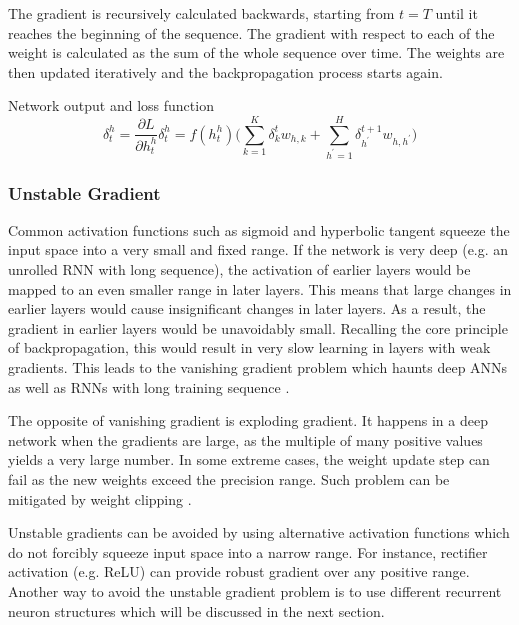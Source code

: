 \documentclass[11pt]{article} %
\theoremstyle{plain}
\theoremstyle{definition}
\begin{document}
The gradient is recursively calculated backwards, starting from \(t=T\) until it reaches the beginning of the sequence. The gradient with respect to each of the weight is calculated as the sum of the whole sequence over time. The weights are then updated iteratively and the backpropagation process starts again.

Network output and loss function
\begin{subequations} 
	\begin{equation}
	\label{differentiation}	
	\delta^h_t=\frac{\partial{L}}{\partial h^h_t}	
	\end{equation}
	\begin{equation}
	\label{weight_update}
	\delta^h_t=f(h^h_t)\Bigg(\sum_{k=1}^{K}\delta_k^tw_{h,k}+\sum_{h^\prime=1}^{H}\delta_{h^\prime}^{t+1}w_{h,h^\prime}\Bigg)
	\end{equation}
\end{subequations}


\subsubsection{Unstable Gradient}

Common activation functions such as sigmoid and hyperbolic tangent squeeze the input space into a very small and fixed range. If the network is very deep (e.g. an unrolled RNN with long sequence), the activation of earlier layers would be mapped to an even smaller range in later layers. This means that large changes in earlier layers would cause insignificant changes in later layers. As a result, the gradient in earlier layers would be unavoidably small. Recalling the core principle of backpropagation, this would result in very slow learning in layers with weak gradients. This leads to the vanishing gradient problem which haunts deep ANNs as well as RNNs with long training sequence \cite{hochreiter1991, hochreiter2001}.

The opposite of vanishing gradient is exploding gradient. It happens in a deep network when the gradients are large, as the multiple of many positive values yields a very large number. In some extreme cases, the weight update step can fail as the new weights exceed the precision range. Such problem can be mitigated by weight clipping \cite{pascanu2012}.

Unstable gradients can be avoided by using alternative activation functions which do not forcibly squeeze input space into a narrow range. For instance, rectifier activation (e.g. ReLU) can provide robust gradient over any positive range. Another way to avoid the unstable gradient problem is to use different recurrent neuron structures which will be discussed in the next section.
\end{document}
